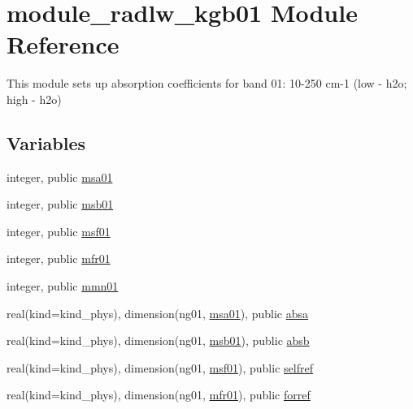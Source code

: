 \hypertarget{namespacemodule__radlw__kgb01}{}\section{module\+\_\+radlw\+\_\+kgb01 Module Reference}
\label{namespacemodule__radlw__kgb01}


This module sets up absorption coefficients for band 01\+: 10-\/250 cm-\/1 (low -\/ h2o; high -\/ h2o)  


\subsection*{Variables}
\begin{DoxyCompactItemize}
\item 
integer, public \hyperlink{namespacemodule__radlw__kgb01_a60db2a67b7f03a52fa88acd2c7874dfc}{msa01}
\item 
integer, public \hyperlink{namespacemodule__radlw__kgb01_ae34d953adc793ad27a294864e3e0e354}{msb01}
\item 
integer, public \hyperlink{namespacemodule__radlw__kgb01_a321c2e84e14d28142d08bb5fbe485a67}{msf01}
\item 
integer, public \hyperlink{namespacemodule__radlw__kgb01_a4bd2e710d96291436f9ee36e99816a19}{mfr01}
\item 
integer, public \hyperlink{namespacemodule__radlw__kgb01_a218c6844f9043f362571f091a4f80522}{mmn01}
\item 
real(kind=kind\+\_\+phys), dimension(ng01, \hyperlink{namespacemodule__radlw__kgb01_a60db2a67b7f03a52fa88acd2c7874dfc}{msa01}), public \hyperlink{namespacemodule__radlw__kgb01_acdbe767d50d503c4a89d4042dd0dee8e}{absa}
\item 
real(kind=kind\+\_\+phys), dimension(ng01, \hyperlink{namespacemodule__radlw__kgb01_ae34d953adc793ad27a294864e3e0e354}{msb01}), public \hyperlink{namespacemodule__radlw__kgb01_abdaefe1c38d8bfcac5ef9b878fac77cb}{absb}
\item 
real(kind=kind\+\_\+phys), dimension(ng01, \hyperlink{namespacemodule__radlw__kgb01_a321c2e84e14d28142d08bb5fbe485a67}{msf01}), public \hyperlink{namespacemodule__radlw__kgb01_a14c7cc68b26c0ab1fdfda6faa2d485d5}{selfref}
\item 
real(kind=kind\+\_\+phys), dimension(ng01, \hyperlink{namespacemodule__radlw__kgb01_a4bd2e710d96291436f9ee36e99816a19}{mfr01}), public \hyperlink{namespacemodule__radlw__kgb01_acd70a32f88808dc40c39edee5b76adbe}{forref}
\item 

\end{DoxyCompactItemize}
